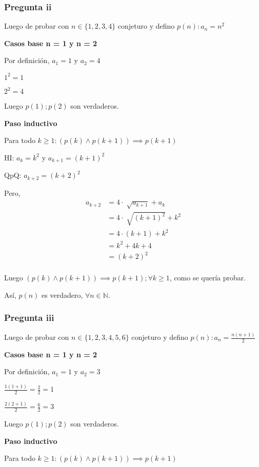 \subsubsection{Pregunta ii}

Luego de probar con $ n \in \{ 1,2,3,4 \} $ conjeturo y defino $ p(n): a_n = n^2 $

\textbf{Casos base n = 1 y n = 2}

Por definición, $a_1 = 1$ y $a_2 = 4$

$ 1^2 = 1$

$ 2^2 = 4 $

Luego $ p(1); p(2) $ son verdaderos.

\textbf{Paso inductivo}

Para todo $k \geq 1: (p(k) \wedge p(k+1)) \implies p(k+1)$

HI: $ a_k = k^2 $ y $ a_{k+1} = (k+1)^2 $

QpQ: $ a_{k+2} = (k+2)^2$

Pero,
\begin{align*}
    a_{k+2} &= 4\cdot \sqrt[]{a_{k+1}} + a_k \\
    &= 4\cdot \sqrt[]{(k+1)^2} + k^2 \\
    &= 4\cdot (k+1) + k^2 \\
    &= k^2 + 4k+ 4 \\
    &= (k+2)^2 \\
\end{align*}

Luego $(p(k) \wedge p(k+1)) \implies p(k+1); \forall k \geq 1$, como se quería probar.

Así, $p(n)$ es verdadero, $\forall n \in \mathbb{N}$.

\subsubsection{Pregunta iii}

Luego de probar con $ n \in \{ 1,2,3,4,5,6 \} $ conjeturo y defino $ p(n): a_n = \frac{n(n+1)}{2} $

\textbf{Casos base n = 1 y n = 2}

Por definición, $a_1 = 1$ y $a_2 = 3$

$ \frac{1(1+1)}{2} = \frac{2}{2} = 1$

$ \frac{2(2+1)}{2} = \frac{6}{2} = 3$

Luego $ p(1); p(2) $ son verdaderos.

\textbf{Paso inductivo}

Para todo $k \geq 1: (p(k) \wedge p(k+1)) \implies p(k+1)$

